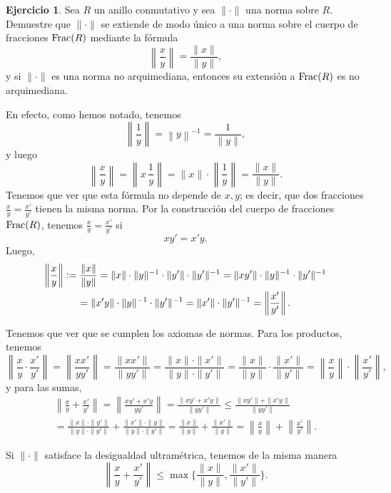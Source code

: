 \documentclass{article}
\numberwithin{equation}{section}
\theoremstyle{definition}
\newtheorem{ejerc}{Ejercicio}
\begin{document}
\begin{ejerc}
  \label{ejerc:extension-de-normas-al-cuerpo-de-fracciones}
  Sea $R$ un anillo conmutativo y sea $\|\cdot\|$ una norma sobre $R$.
  Demuestre que $\|\cdot\|$ se extiende de modo único a una norma sobre
  el cuerpo de fracciones $\operatorname{Frac} (R)$ mediante la fórmula
  $$\left\|\frac{x}{y}\right\| = \frac{\|x\|}{\|y\|},$$
  y si $\|\cdot\|$ es una norma no arquimediana, entonces su extensión
  a $\operatorname{Frac} (R)$ es no arquimediana.

  \ifdefined\solutions\begin{solucion}
    En efecto, como hemos notado, tenemos
    $$\left\|\frac{1}{y}\right\| = \left\|y\right\|^{-1} = \frac{1}{\|y\|},$$
    y luego
    \[ \left\|\frac{x}{y}\right\| =
       \left\|x\,\frac{1}{y}\right\| =
       \|x\|\cdot \left\|\frac{1}{y}\right\| =
       \frac{\|x\|}{\|y\|}. \]
    Tenemos que ver que esta fórmula no depende de $x,y$; es decir,
    que dos fracciones $\frac{x}{y} = \frac{x'}{y'}$ tienen la misma norma.
    Por la construcción del cuerpo de fracciones $\operatorname{Frac} (R)$, tenemos
    $\frac{x}{y} = \frac{x'}{y'}$ si
    $$xy' = x'y.$$
    Luego,
    \begin{multline*}
      \left\|\frac{x}{y}\right\| \mathrel{\mathop:}=
      \frac{\|x\|}{\|y\|} =
      \|x\|\cdot\|y\|^{-1} \cdot \|y'\|\cdot \|y'\|^{-1} =
      \|xy'\| \cdot \|y\|^{-1}\cdot \|y'\|^{-1} \\
    = \|x'y\|\cdot \|y\|^{-1}\cdot \|y'\|^{-1} =
      \|x'\|\cdot \|y'\|^{-1} =
      \left\|\frac{x'}{y'}\right\|.
    \end{multline*}

    Tenemos que ver que se cumplen los axiomas de normas. Para los productos,
    tenemos
    \[ \left\|\frac{x}{y}\cdot \frac{x'}{y'}\right\| =
       \left\|\frac{xx'}{yy'}\right\| =
       \frac{\|xx'\|}{\|yy'\|} =
       \frac{\|x\|\cdot\|x'\|}{\|y\|\cdot\|y'\|} =
       \frac{\|x\|}{\|y\|}\cdot\frac{\|x'\|}{\|y'\|} =
       \left\|\frac{x}{y}\right\| \cdot \left\|\frac{x'}{y'}\right\|, \]
    y para las sumas,
    \begin{multline*}
      \left\|\frac{x}{y} + \frac{x'}{y'}\right\| =
      \left\|\frac{xy' + x'y}{yy'}\right\| =
      \frac{\|xy' + x'y\|}{\|yy'\|} \le
      \frac{\|xy'\| + \|x'y\|}{\|yy'\|} \\
    = \frac{\|x\|\cdot\|y'\|}{\|y\|\cdot \|y'\|} +
      \frac{\|x'\|\cdot\|y\|}{\|y\|\cdot\|y'\|} =
      \frac{\|x\|}{\|y\|} + \frac{\|x'\|}{\|y\|} =
      \left\|\frac{x}{y}\right\| + \left\|\frac{x'}{y'}\right\|.
    \end{multline*}

    Si $\|\cdot\|$ satisface la desigualdad ultramétrica, tenemos de la misma manera
    $$\left\|\frac{x}{y} + \frac{x'}{y'}\right\| \le \max \{ \frac{\|x\|}{\|y\|}, \frac{\|x'\|}{\|y'\|} \}.$$
  \end{solucion}\fi
\end{ejerc}
\end{document}
